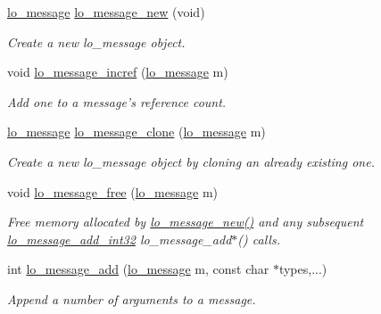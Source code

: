 \begin{DoxyCompactItemize}
\hyperlink{lo__types_8h_ad126083c98d941f00eb72d1690b38d63}{lo\+\_\+message} \hyperlink{group__liblolowlevel_ga1e938ecc9160a194424423b400019410}{lo\+\_\+message\+\_\+new} (void)
\begin{DoxyCompactList}\small\item\em Create a new lo\+\_\+message object. \end{DoxyCompactList}\item 
void \hyperlink{group__liblolowlevel_gae4007dd073375b8448a0c8efcb39da52}{lo\+\_\+message\+\_\+incref} (\hyperlink{lo__types_8h_ad126083c98d941f00eb72d1690b38d63}{lo\+\_\+message} m)
\begin{DoxyCompactList}\small\item\em Add one to a message's reference count. \end{DoxyCompactList}\item 
\hyperlink{lo__types_8h_ad126083c98d941f00eb72d1690b38d63}{lo\+\_\+message} \hyperlink{group__liblolowlevel_ga8cf4889aa1b479e3b6eaf8847c3b9e4f}{lo\+\_\+message\+\_\+clone} (\hyperlink{lo__types_8h_ad126083c98d941f00eb72d1690b38d63}{lo\+\_\+message} m)
\begin{DoxyCompactList}\small\item\em Create a new lo\+\_\+message object by cloning an already existing one. \end{DoxyCompactList}\item 
void \hyperlink{group__liblolowlevel_ga93d3687e77ae20167b82830c917a3e50}{lo\+\_\+message\+\_\+free} (\hyperlink{lo__types_8h_ad126083c98d941f00eb72d1690b38d63}{lo\+\_\+message} m)
\begin{DoxyCompactList}\small\item\em Free memory allocated by \hyperlink{group__liblolowlevel_ga1e938ecc9160a194424423b400019410}{lo\+\_\+message\+\_\+new()} and any subsequent \hyperlink{group__liblolowlevel_ga7c9df1bd975a32fb6c8105e6fe327149}{lo\+\_\+message\+\_\+add\+\_\+int32} lo\+\_\+message\+\_\+add$\ast$() calls. \end{DoxyCompactList}\item 
int \hyperlink{group__liblolowlevel_ga4e7a6d91a06e795ded9676d089abea24}{lo\+\_\+message\+\_\+add} (\hyperlink{lo__types_8h_ad126083c98d941f00eb72d1690b38d63}{lo\+\_\+message} m, const char $\ast$types,...)
\begin{DoxyCompactList}\small\item\em Append a number of arguments to a message. \end{DoxyCompactList}\item 

\end{DoxyCompactItemize}
